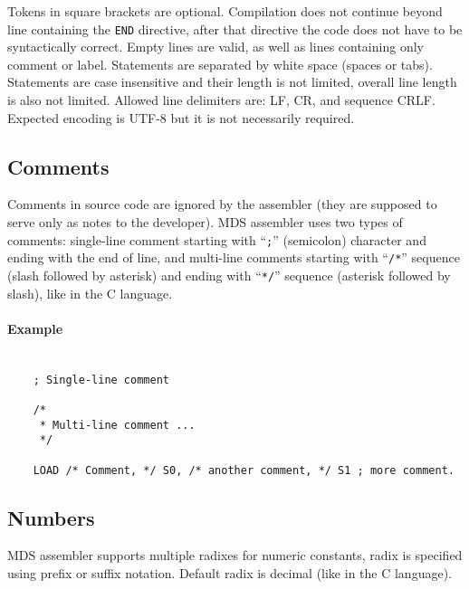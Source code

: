         Tokens in square brackets are optional. Compilation does not continue beyond line containing the \texttt{END} directive, after that directive the code does not have to be syntactically correct. Empty lines are valid, as well as lines containing only comment or label. Statements are separated by white space (spaces or tabs). Statements are case insensitive and their length is not limited, overall line length is also not limited. Allowed line delimiters are: LF, CR, and sequence CRLF. Expected encoding is UTF-8 but it is not necessarily required.

    \subsection{Comments}
        Comments in source code are ignored by the assembler (they are supposed to serve only as notes to the developer). MDS assembler uses two types of comments: single-line comment starting with ``\texttt{;}'' (semicolon) character and ending with the end of line, and multi-line comments starting with ``\texttt{/*}'' sequence (slash followed by asterisk) and ending with ``\texttt{*/}'' sequence (asterisk followed by slash), like in the C language.

        \paragraph{Example}
            ~\\
            \verb'    ; Single-line comment'\\
            \verb'    '\\
            \verb'    /*'\\
            \verb'     * Multi-line comment ...'\\
            \verb'     */'\\
            \verb'    '\\
            \verb'    LOAD /* Comment, */ S0, /* another comment, */ S1 ; more comment.'

    \clearpage
    \subsection{Numbers}
        MDS assembler supports multiple radixes for numeric constants, radix is specified using prefix or suffix notation. Default radix is decimal (like in the C language).

